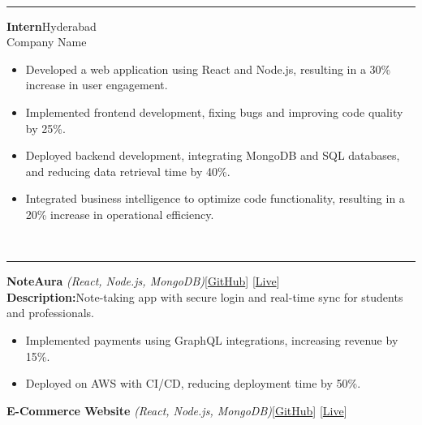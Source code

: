 \documentclass[letterpaper,11pt]{article}
\begin{document}
\par\vspace{6pt}
\par
{}\\
\vspace{2pt}\hrule\vspace{4pt}
\textbf{Intern}\hfill Hyderabad\\
\small Company Name\normalsize\\
\begin{itemize}
  \item Developed a web application using React and Node.js, resulting in a 30\% increase in user engagement.
  \item Implemented frontend development, fixing bugs and improving code quality by 25\%.
  \item Deployed backend development, integrating MongoDB and SQL databases, and reducing data retrieval time by 40\%.
  \item Integrated business intelligence to optimize code functionality, resulting in a 20\% increase in operational efficiency.
\end{itemize}
\par\vspace{3pt}
\par\vspace{6pt}
\par
{}\\
\vspace{2pt}\hrule\vspace{4pt}
\textbf{NoteAura} \textit{(React, Node.js, MongoDB)}\hfill {\color{cyan}[\href{\detokenize{https://github.com/rajeevkavala/NoteAura}}{GitHub}]} {\color{cyan}[\href{\detokenize{https://noteaura.herokuapp.com}}{Live}]}\\
\textbf{Description:}\quad Note-taking app with secure login and real-time sync for students and professionals.\\
\begin{itemize}
  \item Implemented payments using GraphQL integrations, increasing revenue by 15\%.
  \item Deployed on AWS with CI/CD, reducing deployment time by 50\%.
\end{itemize}
\par\vspace{3pt}
\textbf{E-Commerce Website} \textit{(React, Node.js, MongoDB)}\hfill {\color{cyan}[\href{\detokenize{https://github.com/rajeevkavala/Ecommerce}}{GitHub}]} {\color{cyan}[\href{\detokenize{https://ecommerce.herokuapp.com}}{Live}]}\\
\end{document}
